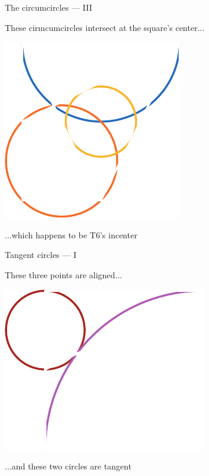 \documentclass[14pt]{beamer}
\begin{document}

    \begin{frame}{The circumcircles --- III}
        \begin{center}
            These cirmcumcircles intersect at the square's center...
        \end{center}
        \vspace{0.90em}
        \hspace{5.25em} \includegraphics[scale=1.0]{figures/figure019g.pdf} \\
        \begin{center}
            ...which happens to be T6's incenter
        \end{center}
    \end{frame}


    \begin{frame}{Tangent circles --- I}
        \begin{center}
            These three points are aligned...
        \end{center}
        \hspace{3.92em} \includegraphics[scale=1.0]{figures/figure019d.pdf} \\
        \begin{center}
             ...and these two circles are tangent
        \end{center}
    \end{frame}
\end{document}
